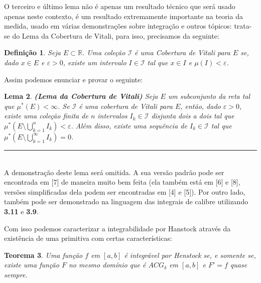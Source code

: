 \documentclass[12pt, a4paper]{article}
\newtheorem{mydef}{Definição}[section]
\newtheorem{lem}[mydef]{Lema}
\newtheorem{thrm}[mydef]{Teorema}
\def\eop{\hfill\rule{2.5mm}{2.5mm}}
\theoremstyle{definition}
\begin{document}
O terceiro e último lema não é apenas um resultado técnico que será usado apenas neste contexto, é um resultado extremamente importante na teoria da medida, usado em várias demonstrações sobre integração e outros tópicos: trata-se do Lema da Cobertura de Vitali, para isso, precisamos da seguinte: 

\begin{mydef}
	
	Seja $E\subset \mathbb{R}$. Uma coleção $\mathcal{I}$ é uma Cobertura de Vitali para $E$ se, dado $x\in E$ e $\varepsilon > 0$, existe um intervalo $I\in \mathcal{I}$ tal que $x\in I$ e $\mu(I) < \varepsilon$.
	
\end{mydef}

Assim podemos enunciar e provar o seguinte: 

\begin{lem}
	
	\textbf{(Lema da Cobertura de Vitali)} Seja $E$ um subconjunto da reta tal que $\mu ^*(E)<\infty$. Se $\mathcal{I}$ é uma cobertura de Vitali para $E$, então, dado $\varepsilon >0$, existe uma coleção finita de $n$ intervalos $I_k\in \mathcal{I}$ disjunta dois a dois tal que $\mu ^*\left(E\setminus \bigcup_{k=1}^n I_k \right)<\varepsilon$. Além disso, existe uma sequência de $I_k\in \mathcal{I}$ tal que  $\mu ^*\left(E\setminus \bigcup_{k=1}^\infty I_k \right)=0$.
	
\end{lem}

\eop \\

A demonstração deste lema será omitida. A sua versão padrão pode ser encontrada em [7] de maneira muito bem feita (ela também está em [6] e [8], versões simplificadas dela podem ser encontradas em [4] e [5]). Por outro lado, também pode ser demonstrado na linguagem das integrais de calibre utilizando \textbf{3.11} e \textbf{3.9}. 

Com isso podemos caracterizar a integrabilidade por Hanstock através da existência de uma primitiva com certas características: 

\begin{thrm}
	
	Uma função $f$ em $[a,b]$ é integrável por Henstock se, e somente se, existe uma função $F$ no mesmo domínio que é  $ACG_\delta$ em $[a,b]$ e $F'=f$ quase sempre. 
	
\end{thrm}
\end{document}
